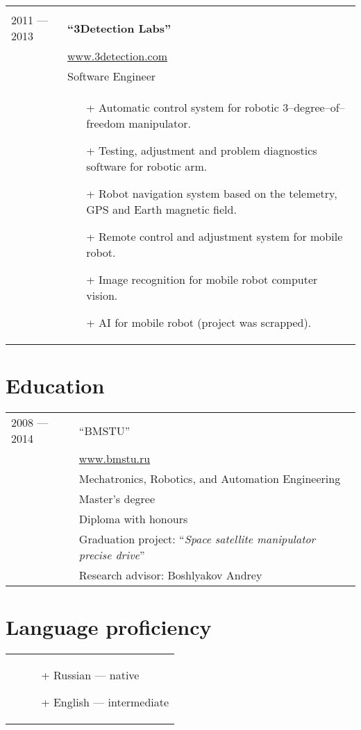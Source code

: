 \documentclass[a4paper, 10pt]{article}
\begin{document}
\begin{longtable}{p{20mm}|p{140mm}}
\begin{itemize}[topsep = 0pt, itemsep = 0pt]
\end{itemize}
\\

2011 --- 2013 & \textbf{``3Detection Labs''} \\
& \href{http://www.3detection.com/}{www.3detection.com} \\
& Software Engineer \\
& \begin{itemize}[topsep = 0pt, itemsep = 0pt]
    \item[+] Automatic control system for robotic 3--degree--of--freedom manipulator.
    \item[+] Testing, adjustment and problem diagnostics software for robotic arm.
    \item[+] Robot navigation system based on the telemetry, GPS and Earth magnetic field.
    \item[+] Remote control and adjustment system for mobile robot.
    \item[+] Image recognition for mobile robot computer vision.
    \item[+] AI for mobile robot (project was scrapped).
\end{itemize}
\\
\end{longtable}

\section{Education}
\begin{longtable}{p{20mm}|p{140mm}}
2008 --- 2014
& ``BMSTU'' \\
& \href{http://www.bmstu.ru}{www.bmstu.ru} \\
& Mechatronics, Robotics, and Automation Engineering \\
& Master's degree \\
& Diploma with honours \\
& Graduation project: ``\textit{Space satellite manipulator precise drive}'' \\
& Research advisor: Boshlyakov Andrey \\
\end{longtable}

\section{Language proficiency}
\begin{longtable}{p{20mm}|p{140mm}}
& \begin{itemize}[topsep = 0pt, itemsep = 0pt]
    \item[+] Russian --- native
    \item[+] English --- intermediate
\end{itemize} \\
\end{longtable}
\end{document}
